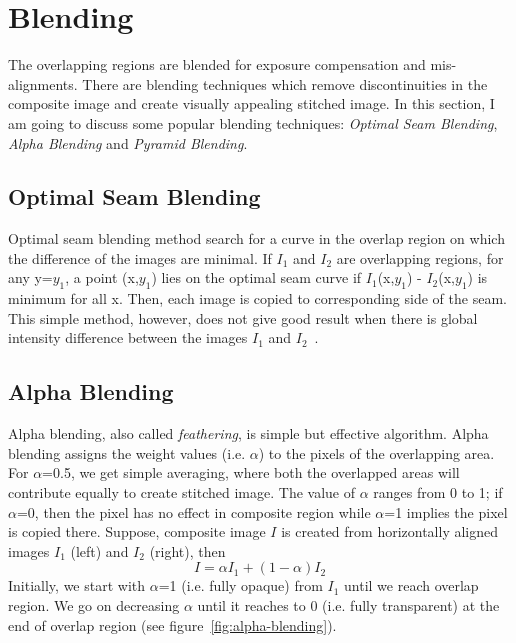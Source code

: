 \section{Blending}
\label{sec:blending}
The overlapping regions are blended for exposure compensation and mis-alignments. There are blending techniques which remove discontinuities in the composite image and create visually appealing stitched image. In this section, I am going to discuss some popular blending techniques: \emph{Optimal Seam Blending}, \emph{Alpha Blending} and \emph{Pyramid Blending}.
\subsection{Optimal Seam Blending}
\label{sec:optimal-seam-blending}
Optimal seam blending method search for a curve in the overlap region on which the difference of the images are minimal. If $I_1$ and $I_2$ are overlapping regions, for any y=$y_1$, a point (x,$y_1$) lies on the optimal seam curve if $I_1$(x,$y_1$) - $I_2$(x,$y_1$) is minimum for all x. Then, each image is copied to corresponding side of the seam. This simple method, however, does not give good result when there is global intensity difference between the images $I_1$ and $I_2$~\cite{levin:04}. 
\subsection{Alpha Blending}
\label{sec:alpha-blending}
Alpha blending, also called \emph{feathering}, is simple but effective algorithm. Alpha blending assigns the weight values (i.e. $\alpha$) to the pixels of the overlapping area. For $\alpha$=0.5, we get simple averaging, where both the overlapped areas will contribute equally to create stitched image. The value of $\alpha$ ranges from 0 to 1; if $\alpha$=0, then the pixel has no effect in composite region while $\alpha$=1 implies the pixel is copied there. Suppose, composite image $I$ is created from horizontally aligned images $I_1$ (left) and $I_2$ (right), then
\begin{equation}
I=\alpha I_1 + (1- \alpha)I_2
\label{eq:alpha-blending}
\end{equation}
Initially, we start with $\alpha$=1 (i.e. fully opaque) from $I_1$ until we reach overlap region. We go on decreasing $\alpha$ until it reaches to 0 (i.e. fully transparent) at the end of overlap region (see figure~\ref{fig:alpha-blending}).

